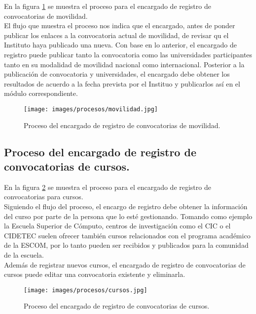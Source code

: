 En la figura \ref{fig:movilidad} se muestra el proceso para el encargado de registro de convocatorias de movilidad. \\

El flujo que muestra el proceso nos indica que el encargado, antes de ponder publicar los enlaces a la convocatoria actual de movilidad, de revisar qu el Instituto haya publicado una nueva. Con base en lo anterior, el encargado de registro puede publicar tanto la convocatoria como las universidades participantes tanto en su modalidad de movilidad nacional como internacional. Posterior a la publicación de convocatoria y universidades, el encargado debe obtener los resultados de acuerdo a la fecha prevista por el Instituo y publicarlos así en el módulo correspondiente.

\begin{figure}[h!]
	\begin{center}
		\texttt{[image: images/procesos/movilidad.jpg]}
		\caption{Proceso del encargado de registro de convocatorias de movilidad.}
		\label{fig:movilidad}
	\end{center}
\end{figure}

\subsection{Proceso del encargado de registro de convocatorias de cursos.}

En la figura \ref{fig:cursos} se muestra el proceso para el encargado de registro de convocatorias para cursos. \\

Siguiendo el flujo del proceso, el encargo de registro debe obtener la información del curso por parte de la persona que lo esté gestionando. Tomando como ejemplo la Escuela Superior de Cómputo, centros de investigación como el CIC o el CIDETEC suelen ofrecer también cursos relacionados con el programa académico de la ESCOM, por lo tanto pueden ser recibidos y publicados para la comunidad de la escuela. \\

Además de registrar nuevos cursos, el encargado de registro de convocatorias de cursos puede editar una convocatoria existente y eliminarla.

\begin{figure}[h!]
	\begin{center}
		\texttt{[image: images/procesos/cursos.jpg]}
		\caption{Proceso del encargado de registro de convocatorias de cursos.}
		\label{fig:cursos}
	\end{center}
\end{figure}